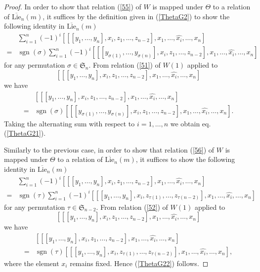 \documentclass[11pt]{amsart}
\theoremstyle{definition}
\numberwithin{equation}{section}
\DeclareMathOperator{\sign}{sgn}
\begin{document}
\begin{proof}
		In order to show that relation (\ref{55}) of  $W$ is mapped under $\Theta$ to a relation of $\overline{\text{Lie}}_n(m)$, it suffices by the definition given in (\ref{ThetaG2}) to show the following identity in $\overline{\text{Lie}}_n(m)$
	\begin{align}\label{ThetaG21} &\sum_{i=1}^{n}(-1)^{i}[[[y_1,\dots,y_n],x_i , z_1,\dots, z_{n-2}],x_1,\dots,\widehat{x_i},\dots, x_n] \\\nonumber=&\sign(\sigma)\sum_{i=1}^{n}(-1)^{i}[[[y_{\sigma(1)},\dots,y_{\sigma(n)}],x_i , z_1,\dots, z_{n-2}],x_1,\dots,\widehat{x_i},\dots, x_n] \end{align}
	for any permutation $\sigma \in \mathfrak{S}_n$. From relation (\ref{51}) of $W(1)$ applied to   \[[[[y_1,\dots,y_n],x_i , z_1,\dots, z_{n-2}],x_1,\dots,\widehat{x_i},\dots, x_n] \]
	we have
	\begin{align*}&[[[y_1,\dots,y_n],x_i , z_1,\dots, z_{n-2}],x_1,\dots,\widehat{x_i},\dots, x_n] \\\nonumber=& \sign(\sigma) [[[y_{\sigma(1)},\dots,y_{\sigma(n)}],x_i , z_1,\dots, z_{n-2}],x_1,\dots,\widehat{x_i},\dots, x_n]. \end{align*}
	Taking the alternating sum with respect to $i=1,\dots, n$ we obtain eq. (\ref{ThetaG21}).
	
		Similarly to the previous case, in order to show that relation (\ref{56}) of  $W$ is mapped under $\Theta$ to a relation of $\overline{\text{Lie}}_n(m)$, it suffices to show the following identity in $\overline{\text{Lie}}_n(m)$
	\begin{align}\label{ThetaG22} &\sum_{i=1}^{n}(-1)^{i}[[[y_1,\dots,y_n],x_i , z_1,\dots, z_{n-2}],x_1,\dots,\widehat{x_i},\dots, x_n] \\\nonumber=& \sign(\tau)\sum_{i=1}^{n}(-1)^{i}[[[y_{1},\dots,y_{n}],x_i , z_{\tau(1)},\dots, z_{\tau(n-2)}],x_1,\dots,\widehat{x_i},\dots, x_n] \end{align}
	for any permutation $\tau \in \mathfrak{S}_{n-2}$. From relation (\ref{52}) of $W(1)$ applied to   \[[[[y_1,\dots,y_n],x_i , z_1,\dots, z_{n-2}],x_1,\dots,\widehat{x_i},\dots, x_n] \]
	we have
	\begin{align*}&[[[y_1,\dots,y_n],x_i , z_1,\dots, z_{n-2}],x_1,\dots,\widehat{x_i},\dots, x_n] \\\nonumber=&\sign(\tau)[[[y_{1},\dots,y_{n}],x_i , z_{\tau(1)},\dots, z_{\tau(n-2)}],x_1,\dots,\widehat{x_i},\dots, x_n], \end{align*}
	where the element $x_i$ remains fixed. Hence (\ref{ThetaG22}) follows.
	

\end{proof}
\end{document}
